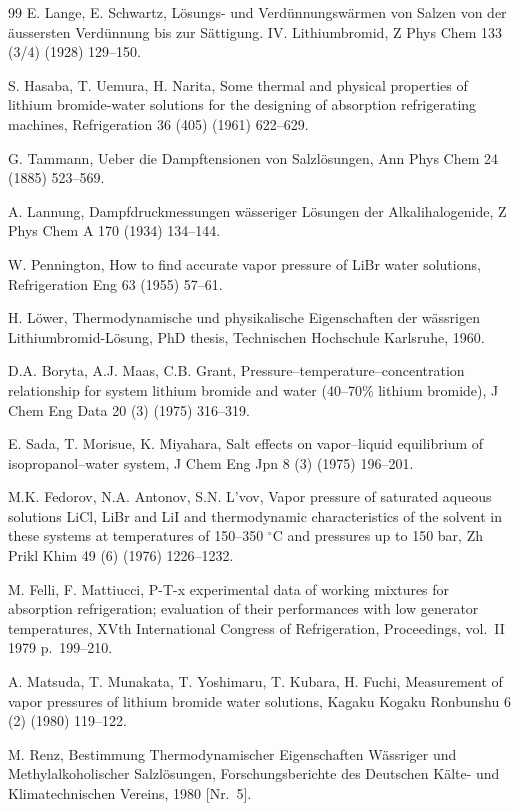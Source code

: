 \documentclass[11pt]{article}
\begin{document}
\begin{thebibliography}{99}
 E. Lange, E. Schwartz, L\"osungs- und
Verd\"unnungsw\"armen von Salzen von der \"aussersten Verd\"unnung bis
zur S\"attigung. IV. Lithiumbromid, Z Phys Chem 133 (3/4) (1928)
129--150.

 S. Hasaba, T. Uemura, H. Narita, Some thermal and
physical properties of lithium bromide-water solutions for the
designing of absorption refrigerating machines, Refrigeration 36 (405)
(1961) 622--629.

 G. Tammann, Ueber die Dampftensionen von
Salzl\"osungen, Ann Phys Chem 24 (1885) 523--569.

 A. Lannung, Dampfdruckmessungen w\"asseriger L\"osungen
der Alkalihalogenide, Z Phys Chem A 170 (1934) 134--144.

 W. Pennington, How to find accurate vapor pressure of
LiBr water solutions, Refrigeration Eng 63 (1955) 57--61.

 H. L\"ower, Thermodynamische und physikalische
Eigenschaften der w\"assrigen Lithiumbromid-L\"osung, PhD thesis,
Technischen Hochschule Karlsruhe, 1960.

 D.A. Boryta, A.J. Maas, C.B. Grant,
Pressure--temperature--concentration relationship for system lithium
bromide and water (40--70\% lithium bromide), J Chem Eng Data 20 (3)
(1975) 316--319.

 E. Sada, T. Morisue, K. Miyahara, Salt effects on
vapor--liquid equilibrium of isopropanol--water system, J Chem Eng Jpn
8 (3) (1975) 196--201.

 M.K. Fedorov, N.A. Antonov, S.N. L'vov, Vapor pressure of
saturated aqueous solutions LiCl, LiBr and LiI and thermodynamic
characteristics of the solvent in these systems at temperatures of
150--350 $^{\circ}$C and pressures up to 150 bar, Zh Prikl Khim 49 (6)
(1976) 1226--1232.

 M. Felli, F. Mattiucci, P-T-x experimental data of
working mixtures for absorption refrigeration; evaluation of their
performances with low generator temperatures, XVth International
Congress of Refrigeration, Proceedings, vol.\ II 1979 p.\ 199--210.

 A. Matsuda, T. Munakata, T. Yoshimaru, T. Kubara,
H. Fuchi, Measurement of vapor pressures of lithium bromide water
solutions, Kagaku Kogaku Ronbunshu 6 (2) (1980) 119--122.

 M. Renz, Bestimmung Thermodynamischer Eigenschaften
W\"assriger und Methylalkoholischer Salzl\"osungen,
Forschungsberichte des Deutschen K\"alte- und Klimatechnischen
Vereins, 1980 [Nr.\ 5].


\end{thebibliography}
\end{document}
